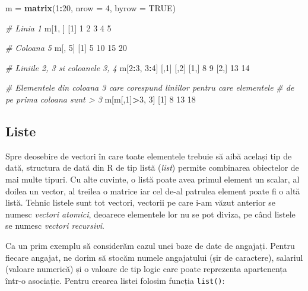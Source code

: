 \documentclass[]{article}
\newenvironment{Shaded}{\begin{snugshade}}{\end{snugshade}}
\newcommand{\CommentTok}[1]{\textcolor[rgb]{0.56,0.35,0.01}{\textit{#1}}}
\newcommand{\DataTypeTok}[1]{\textcolor[rgb]{0.13,0.29,0.53}{#1}}
\newcommand{\DecValTok}[1]{\textcolor[rgb]{0.00,0.00,0.81}{#1}}
\newcommand{\KeywordTok}[1]{\textcolor[rgb]{0.13,0.29,0.53}{\textbf{#1}}}
\newcommand{\NormalTok}[1]{#1}
\newcommand{\OperatorTok}[1]{\textcolor[rgb]{0.81,0.36,0.00}{\textbf{#1}}}
\newcommand{\OtherTok}[1]{\textcolor[rgb]{0.56,0.35,0.01}{#1}}
\newcommand{\StringTok}[1]{\textcolor[rgb]{0.31,0.60,0.02}{#1}}
\begin{document}
\begin{Shaded}
\begin{Highlighting}[]
\NormalTok{m =}\StringTok{ }\KeywordTok{matrix}\NormalTok{(}\DecValTok{1}\OperatorTok{:}\DecValTok{20}\NormalTok{, }\DataTypeTok{nrow =} \DecValTok{4}\NormalTok{, }\DataTypeTok{byrow =} \OtherTok{TRUE}\NormalTok{)}

\CommentTok{# Linia 1}
\NormalTok{m[}\DecValTok{1}\NormalTok{, ]}
\NormalTok{[}\DecValTok{1}\NormalTok{] }\DecValTok{1} \DecValTok{2} \DecValTok{3} \DecValTok{4} \DecValTok{5}

\CommentTok{# Coloana 5}
\NormalTok{m[, }\DecValTok{5}\NormalTok{]}
\NormalTok{[}\DecValTok{1}\NormalTok{]  }\DecValTok{5} \DecValTok{10} \DecValTok{15} \DecValTok{20}

\CommentTok{# Liniile 2, 3 si coloanele 3, 4}
\NormalTok{m[}\DecValTok{2}\OperatorTok{:}\DecValTok{3}\NormalTok{, }\DecValTok{3}\OperatorTok{:}\DecValTok{4}\NormalTok{]}
\NormalTok{     [,}\DecValTok{1}\NormalTok{] [,}\DecValTok{2}\NormalTok{]}
\NormalTok{[}\DecValTok{1}\NormalTok{,]    }\DecValTok{8}    \DecValTok{9}
\NormalTok{[}\DecValTok{2}\NormalTok{,]   }\DecValTok{13}   \DecValTok{14}

\CommentTok{# Elementele din coloana 3 care corespund liniilor pentru care elementele }
\CommentTok{# de pe prima coloana sunt > 3}
\NormalTok{m[m[,}\DecValTok{1}\NormalTok{]}\OperatorTok{>}\DecValTok{3}\NormalTok{, }\DecValTok{3}\NormalTok{]}
\NormalTok{[}\DecValTok{1}\NormalTok{]  }\DecValTok{8} \DecValTok{13} \DecValTok{18}
\end{Highlighting}
\end{Shaded}

\hypertarget{liste}{%
\subsection{Liste}\label{liste}}

Spre deosebire de vectori în care toate elementele trebuie să aibă
același tip de dată, structura de dată din R de tip listă (\emph{list})
permite combinarea obiectelor de mai multe tipuri. Cu alte cuvinte, o
listă poate avea primul element un scalar, al doilea un vector, al
treilea o matrice iar cel de-al patrulea element poate fi o altă listă.
Tehnic listele sunt tot vectori, vectorii pe care i-am văzut anterior se
numesc \emph{vectori atomici}, deoarece elementele lor nu se pot diviza,
pe când listele se numesc \emph{vectori recursivi}.

Ca un prim exemplu să considerăm cazul unei baze de date de angajați.
Pentru fiecare angajat, ne dorim să stocăm numele angajatului (șir de
caractere), salariul (valoare numerică) și o valoare de tip logic care
poate reprezenta apartenența într-o asociație. Pentru crearea listei
folosim funcția \texttt{list()}:
\end{document}
